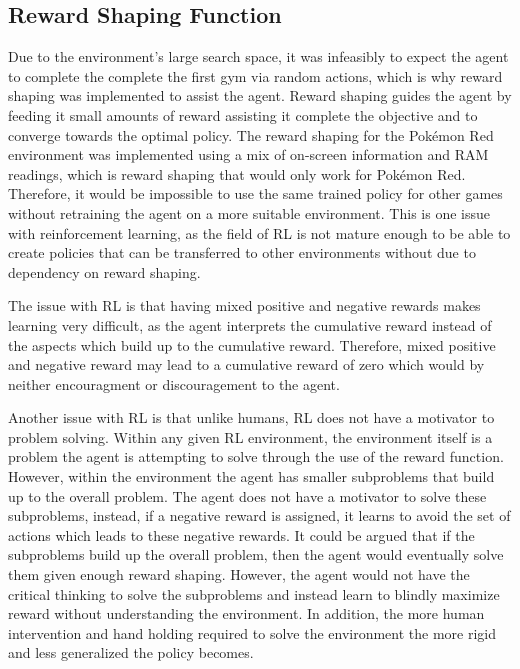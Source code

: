 \subsection{Reward Shaping Function}

Due to the environment's large search space, it was infeasibly to expect the agent to complete the complete the first gym via random actions, which is why reward shaping was implemented to assist the agent. Reward shaping guides the agent by feeding it small amounts of reward assisting it complete the objective and to converge towards the optimal policy. The reward shaping for the Pokémon Red environment was implemented using a mix of on-screen information and RAM readings, which is reward shaping that would only work for Pokémon Red. Therefore, it would be impossible to use the same trained policy for other games without retraining the agent on a more suitable environment. This is one issue with reinforcement learning, as the field of RL is not mature enough to be able to create policies that can be transferred to other environments without due to dependency on reward shaping.

The issue with RL is that having mixed positive and negative rewards makes learning very difficult, as the agent interprets the cumulative reward instead of the aspects  which build up to the cumulative reward. Therefore, mixed positive and negative reward may lead to a cumulative reward of zero which would by neither encouragment or discouragement to the agent. 

Another issue with RL is that unlike humans, RL does not have a motivator to problem solving. Within any given RL environment, the environment itself is a problem the agent is attempting to solve through the use of the reward function. However, within the environment the agent has smaller subproblems that build up to the overall problem. The agent does not have a motivator to solve these subproblems, instead, if a negative reward is assigned, it learns to avoid the set of actions which leads to these negative rewards. It could be argued that if the subproblems build up the overall problem, then the agent would eventually solve them given enough reward shaping. However, the agent would not have the critical thinking to solve the subproblems and instead learn to blindly maximize reward without understanding the environment. In addition, the more human intervention and hand holding required to solve the environment the more rigid and less generalized the policy becomes.

